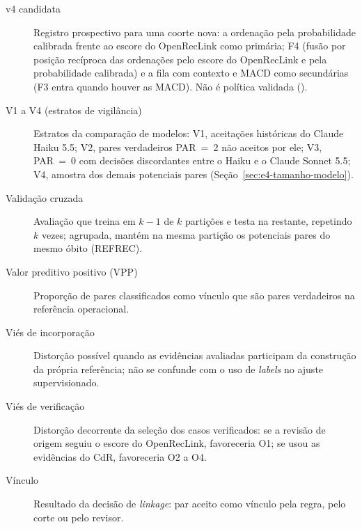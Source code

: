 \begin{description}
\item[v4 candidata] Registro prospectivo para uma coorte nova: a ordenação pela probabilidade calibrada frente ao escore do OpenRecLink como primária; F4 (fusão por posição recíproca das ordenações pelo escore do OpenRecLink e pela probabilidade calibrada) e a fila com contexto e MACD como secundárias (F3 entra quando houver as MACD). Não é política validada ().

\item[V1 a V4 (estratos de vigilância)] Estratos da comparação de modelos: V1, aceitações históricas do Claude Haiku 5.5; V2, pares verdadeiros PAR~=~2 não aceitos por ele; V3, PAR~=~0 com decisões discordantes entre o Haiku e o Claude Sonnet 5.5; V4, amostra dos demais potenciais pares (Seção~\ref{sec:e4-tamanho-modelo}).

\item[Validação cruzada] Avaliação que treina em $k{-}1$ de $k$ partições e testa na restante, repetindo $k$ vezes; agrupada, mantém na mesma partição os potenciais pares do mesmo óbito (REFREC).

\item[Valor preditivo positivo (VPP)] Proporção de pares classificados como vínculo que são pares verdadeiros na referência operacional.

\item[Viés de incorporação] Distorção possível quando as evidências avaliadas participam da construção da própria referência; não se confunde com o uso de \textit{labels} no ajuste supervisionado.

\item[Viés de verificação] Distorção decorrente da seleção dos casos verificados: se a revisão de origem seguiu o escore do OpenRecLink, favoreceria O1; se usou as evidências do CdR, favoreceria O2 a O4.

\item[Vínculo] Resultado da decisão de \textit{linkage}: par aceito como vínculo pela regra, pelo corte ou pelo revisor.

\end{description}
